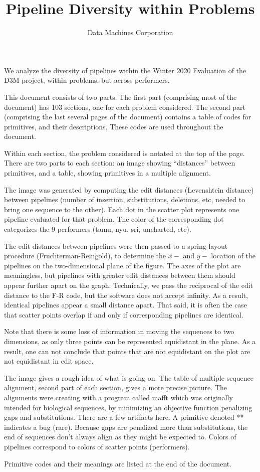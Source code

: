 \documentclass{article}
\title{Pipeline Diversity within Problems}
\author{Data Machines Corporation}
\begin{document}
\maketitle

We analyze the diversity of pipelines within the Winter 2020
Evaluation of the D3M project, within problems, but across
performers.

This document consists of two parts.  The first part (comprising most
of the document) has 103 sections, one for each problem considered.
The second part (comprising the last several pages of the document)
contains a table of codes for primitives, and their descriptions.
These codes are used throughout the document.

Within each section, the problem considered is notated at the top of
the page.  There are two parts to each section: an image showing
``distances'' between primitives, and a table, showing primitives in a
multiple alignment.

The image was generated by computing the edit distances (Levenshtein
distance) between pipelines (number of insertion, substitutions,
deletions, etc, needed to bring one sequence to the other).  Each dot
in the scatter plot represents one pipeline evaluated for that
problem.  The color of the corresponding dot categorizes the 9
performers (tamu, nyu, sri, uncharted, etc).

The edit distances between pipelines were then passed to a spring
layout procedure (Fruchterman-Reingold), to determine the $x-$ and
$y-$ location of the pipelines on the two-dimensional plane of the
figure.  The axes of the plot are meaningless, but pipelines with
greater edit distances between them should appear further apart on the
graph.  Technically, we pass the reciprocal of the edit distance to
the F-R code, but the software does not accept infinity.  As a result,
identical pipelines appear a small distance apart.  That said, it is
often the case that scatter points overlap if and only if
corresponding pipelines are identical.

Note that there is some loss of information in moving the sequences to
two dimensions, as only three points can be represented equidistant in
the plane.  As a result, one can not conclude that points that are not
equidistant on the plot are not equidistant in edit space.

The image gives a rough idea of what is going on.  The table of
multiple sequence alignment, second part of each section, gives a more
precise picture.  The alignments were creating with a program called
mafft which was originally intended for biological sequences, by
minimizing an objective function penalizing gaps and substitutions.
There are a few artifacts here.  A primitive denoted ** indicates a bug
(rare).  Because gaps are penalized more than substitutions, the end
of sequences don't always align as they might be expected to.  Colors
of pipelines correspond to colors of scatter points (performers).

Primitive codes and their meanings are listed at the end of the document.
\end{document}
